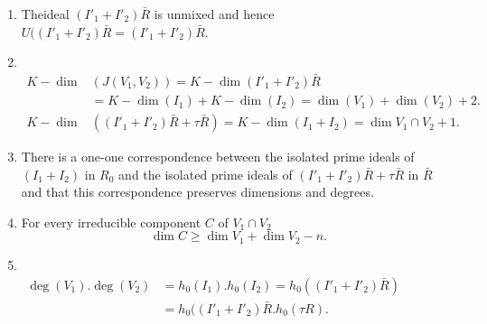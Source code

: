 \setcounter{lemma}{2}
\begin{lemma}\label{chap2:sec2:lem2.3}
  \begin{enumerate}[\rm 1.]
  \item The\pageoriginale ideal $(I'_1 + I'_2) \bar{R}$ is unmixed and
    hence $U ((I'_1  + I'_2)\bar{R} = (I'_1 + I'_2)\bar{R}$. 
  \item ~
    \vskip -1.4cm
    \begin{align*}
      K-\dim & (J(V_1, V_2)) = K-\dim (I'_1 + I'_2) \bar{R}\\ 
      &= K-\dim (I_1) + K-\dim (I_2) = \dim (V_1) + \dim (V_2)+2.\\ 
      K-\dim & ((I'_1+I'_2) \bar{R}+\tau \bar{R}) = K-\dim (I_1+I_2)  = \dim
      V_1 \cap V_2 +1. 
    \end{align*}
  \item There is a one-one correspondence between the isolated prime
    ideals of $(I_1+I_2)$ in $R_0$ and the isolated prime ideals of
    $(I'_1 + I'_2) \bar{R}+\tau \bar{R}$ in $\bar{R}$ and that this
    correspondence preserves dimensions and degrees. 
  \item For every irreducible component $C$ of $V_1 \cap V_2$
    $$
    \dim C \ge \dim V_1 + \dim V_2 - n.
    $$
  \item ~
    \vskip -1.45cm
    \begin{align*}
      \deg (V_1). \deg (V_2) & = h_0(I_1). h_0(I_2)=h_0 ((I'_1 + I'_2)
      \bar{R})\hspace{2cm}\\ 
      & = h_0 ((I'_1 + I'_2) \bar{R}. h_0 (\tau R).
    \end{align*}
  \end{enumerate}
\end{lemma}

